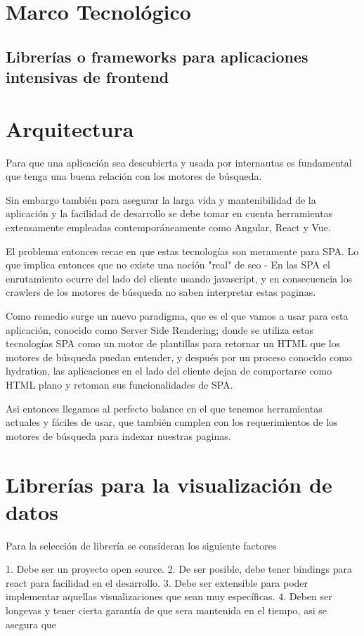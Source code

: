 \section{Marco Tecnológico}

\subsection{Librerías o frameworks para aplicaciones intensivas de frontend }

\section{Arquitectura}

Para que una aplicación sea descubierta y usada por internautas es fundamental que tenga una buena relación con los motores de búsqueda.

Sin embargo también para asegurar la larga vida y mantenibilidad de la aplicación y la facilidad de desarrollo se debe tomar en cuenta herramientas extensamente empleadas contemporáneamente como Angular, React y Vue.

El problema entonces recae en que estas tecnologías son meramente para SPA. Lo que implica entonces que no existe una noción "real" de seo - En las SPA el enrutamiento ocurre del lado del cliente usando javascript, y en consecuencia los crawlers de los motores de búsqueda no saben interpretar estas paginas.

Como remedio surge un nuevo paradigma, que es el que vamos a usar para esta aplicación, conocido como Server Side Rendering; donde se utiliza estas tecnologías SPA como un motor de plantillas para retornar un HTML que los motores de búsqueda puedan entender, y después por un proceso conocido como hydration, las aplicaciones en el lado del cliente dejan de comportarse como HTML plano y retoman sus funcionalidades de SPA.

Asi entonces llegamos al perfecto balance en el que tenemos herramientas actuales y fáciles de usar, que también cumplen con los requerimientos de los motores de búsqueda para indexar nuestras paginas.

\section{Librerías para la visualización de datos}

Para la selección de librería se consideran los siguiente factores

1. Debe ser un proyecto open source.
2. De ser posible, debe tener bindings para react para facilidad en el desarrollo.
3. Debe ser extensible para poder implementar aquellas visualizaciones que sean muy específicas.
4. Deben ser longevas y tener cierta garantía de que sera mantenida en el tiempo, asi se asegura que 

